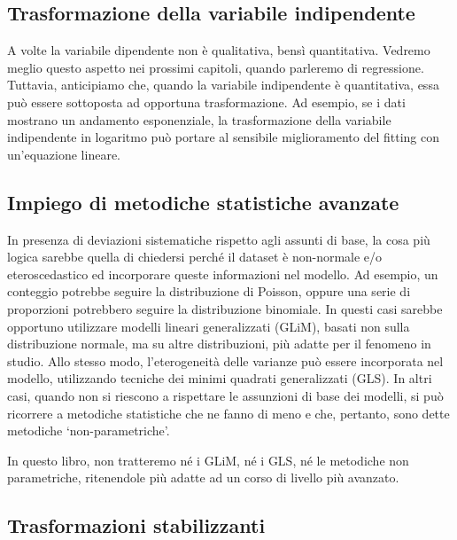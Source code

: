 \documentclass[a4paper,12pt,oneside]{book}
\begin{document}
\hypertarget{trasformazione-della-variabile-indipendente}{%
\subsection{Trasformazione della variabile indipendente}\label{trasformazione-della-variabile-indipendente}}

A volte la variabile dipendente non è qualitativa, bensì quantitativa. Vedremo meglio questo aspetto nei prossimi capitoli, quando parleremo di regressione. Tuttavia, anticipiamo che, quando la variabile indipendente è quantitativa, essa può essere sottoposta ad opportuna trasformazione. Ad esempio, se i dati mostrano un andamento esponenziale, la trasformazione della variabile indipendente in logaritmo può portare al sensibile miglioramento del fitting con un'equazione lineare.

\hypertarget{impiego-di-metodiche-statistiche-avanzate}{%
\subsection{Impiego di metodiche statistiche avanzate}\label{impiego-di-metodiche-statistiche-avanzate}}

In presenza di deviazioni sistematiche rispetto agli assunti di base, la cosa più logica sarebbe quella di chiedersi perché il dataset è non-normale e/o eteroscedastico ed incorporare queste informazioni nel modello. Ad esempio, un conteggio potrebbe seguire la distribuzione di Poisson, oppure una serie di proporzioni potrebbero seguire la distribuzione binomiale. In questi casi sarebbe opportuno utilizzare modelli lineari generalizzati (GLiM), basati non sulla distribuzione normale, ma su altre distribuzioni, più adatte per il fenomeno in studio. Allo stesso modo, l'eterogeneità delle varianze può essere incorporata nel modello, utilizzando tecniche dei minimi quadrati generalizzati (GLS). In altri casi, quando non si riescono a rispettare le assunzioni di base dei modelli, si può ricorrere a metodiche statistiche che ne fanno di meno e che, pertanto, sono dette metodiche `non-parametriche'.

In questo libro, non tratteremo né i GLiM, né i GLS, né le metodiche non parametriche, ritenendole più adatte ad un corso di livello più avanzato.

\hypertarget{trasformazioni-stabilizzanti}{%
\subsection{Trasformazioni stabilizzanti}\label{trasformazioni-stabilizzanti}}
\end{document}
